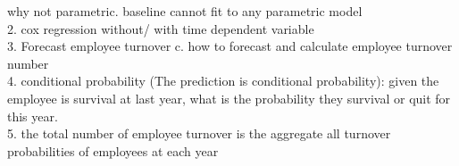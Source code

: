 \documentclass[12pt,letterpaper]{article}
\begin{document}
   why not parametric. baseline cannot fit to any parametric model\\
   2. cox regression without/ with time dependent variable\\
   3. Forecast employee turnover  c. how to forecast and calculate employee turnover number\\
   4. conditional probability (The prediction is conditional probability): given the employee is survival at last year, what is the probability they survival or quit for this year.\\
   5. the total number of employee turnover is the aggregate all turnover probabilities of employees at each year\\
\end{document}
